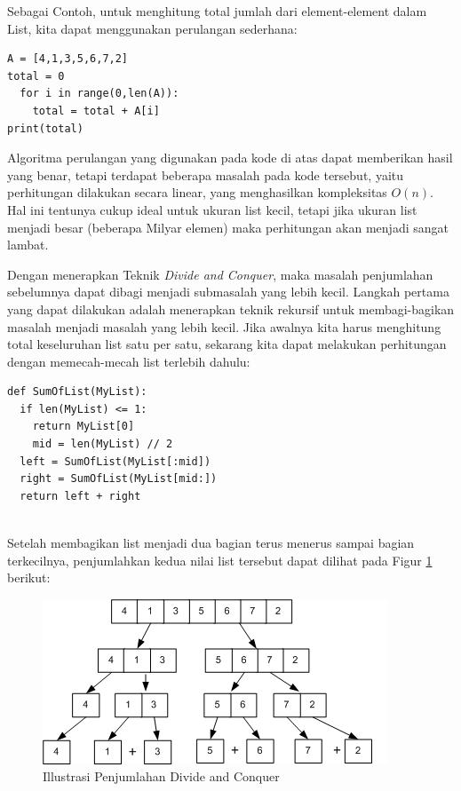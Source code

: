 Sebagai Contoh, untuk menghitung total jumlah dari element-element dalam List, kita dapat menggunakan perulangan sederhana:



\lstset{language=Python}
\label{lst:SimpleSum}
\begin{lstlisting}[frame=single]
A = [4,1,3,5,6,7,2]
total = 0
  for i in range(0,len(A)):
    total = total + A[i]
print(total)
\end{lstlisting}

Algoritma perulangan yang digunakan pada kode di atas dapat memberikan hasil yang benar, tetapi terdapat beberapa masalah pada kode tersebut, yaitu perhitungan dilakukan secara linear, yang menghasilkan kompleksitas $O(n)$. Hal ini tentunya cukup ideal untuk ukuran list kecil, tetapi jika ukuran list menjadi besar (beberapa Milyar elemen) maka perhitungan akan menjadi sangat lambat.

Dengan menerapkan Teknik \textit{Divide and Conquer}, maka masalah penjumlahan sebelumnya dapat dibagi menjadi submasalah yang lebih kecil. Langkah pertama yang dapat dilakukan adalah menerapkan teknik rekursif untuk membagi-bagikan masalah menjadi masalah yang lebih kecil. Jika awalnya kita harus menghitung total keseluruhan list satu per satu, sekarang kita dapat melakukan perhitungan dengan memecah-mecah list terlebih dahulu:

\lstset{language=Python}
\label{lst:DivideAndConquerSum}
\begin{lstlisting}[frame=single]
def SumOfList(MyList):
  if len(MyList) <= 1:
    return MyList[0] 
	mid = len(MyList) // 2
  left = SumOfList(MyList[:mid])
  right = SumOfList(MyList[mid:])
  return left + right
	
\end{lstlisting}

Setelah membagikan list menjadi dua bagian terus menerus sampai bagian terkecilnya, penjumlahkan kedua nilai list tersebut dapat dilihat pada Figur \ref{fig:DivideAndConquerSum} berikut:

\begin{figure}[htbp]
\begin{center}
	\includegraphics[scale=0.7]{fig/sunario-3/Sum.png}%
	\caption{Illustrasi Penjumlahan Divide and Conquer}%
	\label{fig:DivideAndConquerSum}%
\end{center}
\end{figure}


